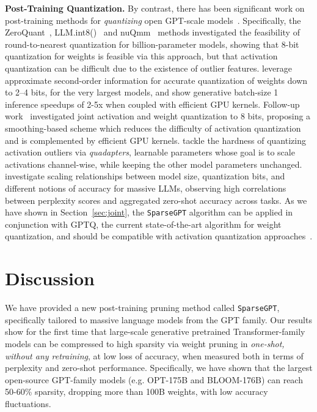 \documentclass{article}
\theoremstyle{plain}
\theoremstyle{definition}
\theoremstyle{remark}
\newcommand{\sparsegpt}[1]{\texttt{SparseGPT}}
\begin{document}
\textbf{Post-Training Quantization.} 
By contrast, there has been significant work on post-training methods for \emph{quantizing} open GPT-scale models~\cite{zhang2022opt, scao2022bloom}. 
Specifically, the ZeroQuant~\cite{yao2022zeroquant}, LLM.int8()~\cite{dettmers2022llm} and nuQmm~\cite{park2022nuqmm} methods investigated the feasibility of round-to-nearest quantization for billion-parameter models, showing that 8-bit quantization for weights is feasible via this approach, but that activation quantization can be difficult due to the existence of outlier features. 
\citet{frantar2022gptq} leverage approximate second-order information for accurate quantization of weights down to 2--4 bits, for the very largest models, and show generative batch-size 1 inference speedups of 2-5x when coupled with efficient GPU kernels.
Follow-up work~\citep{xiao2022smoothquant} 
investigated joint activation and weight quantization  to 8 bits, proposing a smoothing-based scheme which reduces the difficulty of activation quantization and is complemented by efficient GPU kernels. 
\citet{park2022quadapter} tackle the hardness of quantizing activation outliers via \emph{quadapters}, learnable parameters whose goal is to scale activations channel-wise, while keeping the other model parameters unchanged. \citet{dettmers2022case} investigate scaling relationships between model size, quantization bits, and different notions of accuracy for massive LLMs, observing high correlations between perplexity scores and aggregated zero-shot accuracy across tasks.
As we have shown in Section~\ref{sec:joint}, the \sparsegpt{} algorithm can be applied in conjunction with GPTQ, the current state-of-the-art algorithm for weight quantization, and should be compatible with activation quantization approaches~\cite{xiao2022smoothquant, park2022quadapter}.

\section{Discussion}
\label{sec:discussion}

We have provided a new post-training pruning method called \sparsegpt{}, specifically tailored to massive language models from the GPT family. Our results show for the first time that large-scale generative pretrained Transformer-family models can be compressed to high sparsity via weight pruning in \emph{one-shot, without any retraining}, at low loss of accuracy, when measured both in terms of perplexity and zero-shot performance. 
Specifically, we have shown that the largest open-source GPT-family models (e.g. OPT-175B and BLOOM-176B)  can reach 50-60\% sparsity, dropping more than 100B weights, with low accuracy fluctuations.
\end{document}
